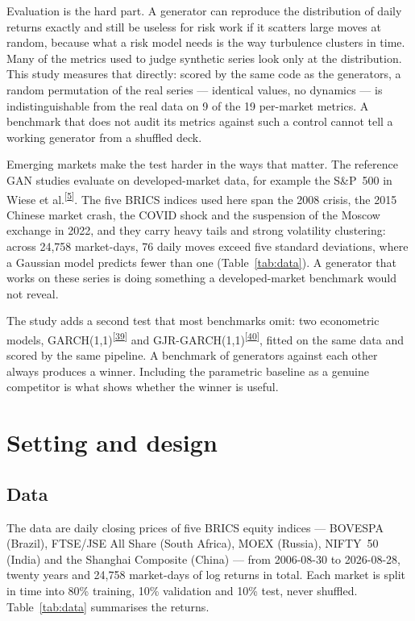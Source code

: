 \documentclass[11pt,a4paper]{article}
\makeatletter
\newcommand{\tcite}[1]{\textsuperscript{[\hyperlink{R:#1}{#1}]}}
\DeclareRobustCommand{\_}{\ifmmode\nfss@text{\textunderscore}\else\textunderscore\allowbreak\fi}
\makeatother
\begin{document}
Evaluation is the hard part. A generator can reproduce the distribution of daily returns exactly and still be useless for risk work if it scatters large moves at random, because what a risk model needs is the way turbulence clusters in time. Many of the metrics used to judge synthetic series look only at the distribution. This study measures that directly: scored by the same code as the generators, a random permutation of the real series --- identical values, no dynamics --- is indistinguishable from the real data on 9 of the 19 per-market metrics. A benchmark that does not audit its metrics against such a control cannot tell a working generator from a shuffled deck.

Emerging markets make the test harder in the ways that matter. The reference GAN studies evaluate on developed-market data, for example the S\&P~500 in Wiese et al.\tcite{5}. The five BRICS indices used here span the 2008 crisis, the 2015 Chinese market crash, the COVID shock and the suspension of the Moscow exchange in 2022, and they carry heavy tails and strong volatility clustering: across 24,758 market-days, 76 daily moves exceed five standard deviations, where a Gaussian model predicts fewer than one (Table~\ref{tab:data}). A generator that works on these series is doing something a developed-market benchmark would not reveal.

The study adds a second test that most benchmarks omit: two econometric models, GARCH(1,1)\tcite{39} and GJR-GARCH(1,1)\tcite{40}, fitted on the same data and scored by the same pipeline. A benchmark of generators against each other always produces a winner. Including the parametric baseline as a genuine competitor is what shows whether the winner is useful.
\section{Setting and design}
\label{sec:design}

\subsection{Data}
\label{sec:data}
The data are daily closing prices of five BRICS equity indices --- BOVESPA (Brazil), FTSE/JSE All Share (South Africa), MOEX (Russia), NIFTY~50 (India) and the Shanghai Composite (China) --- from 2006-08-30 to 2026-08-28, twenty years and 24,758 market-days of log returns in total. Each market is split in time into 80\% training, 10\% validation and 10\% test, never shuffled. Table~\ref{tab:data} summarises the returns.
\end{document}

